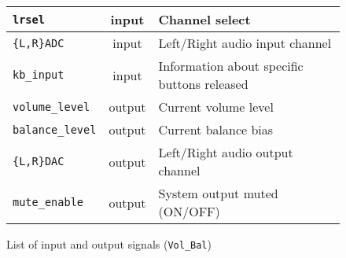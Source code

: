 \begin{figure}[h]
  \centering
  \caption{List of input and output signals (\texttt{Vol\_Bal})}
  \begin{tabular}{|l|c|l|}
    \hline
    \verb+lrsel+ & input & Channel select \\    \hline
    \verb+{L,R}ADC+ & input & Left/Right audio input channel \\    \hline
    \verb+kb_input+ & input & Information about specific buttons released \\    \hline
    \verb+volume_level+ & output & Current volume level \\    \hline
    \verb+balance_level+ & output & Current balance bias \\    \hline
    \verb+{L,R}DAC+ & output & Left/Right audio output channel \\    \hline
    \verb+mute_enable+ & output & System output muted (ON/OFF) \\    \hline
  \end{tabular}
\end{figure}